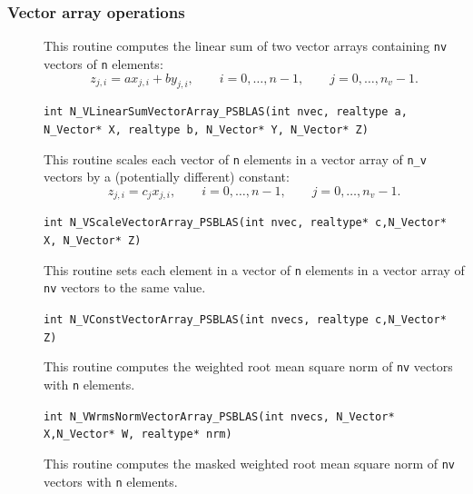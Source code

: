 \documentclass[twoside,a4paper]{refart}
\theoremstyle{definition}
\begin{document}
	\subsubsection{Vector array operations}
 \begin{description}
 	\item[] This routine computes the linear sum of two vector arrays
 	containing \lstinline[style=CStyle]|nv| vectors of \lstinline[style=CStyle]|n| elements:
 	\begin{equation*}
 		z_{j,i} = a x_{j,i} + b y_{j,i}, \qquad i=0,\ldots,n-1, \qquad j=0,\ldots,n_v -1.
 	\end{equation*}
 	
 	 \lstinline[style=CStyle]|int N_VLinearSumVectorArray_PSBLAS(int nvec, realtype a, N_Vector* X, realtype b, N_Vector* Y, N_Vector* Z)|
 	
 	\item[] This routine scales each vector of \lstinline[style=CStyle]|n| elements in a vector
 	array of \lstinline[style=CStyle]|n_v| vectors by a (potentially different) constant:
 	\begin{equation*}
 		z_{j,i} = c_j x_{j,i}, \qquad i=0,\ldots,n-1, \qquad j=0,\ldots,n_v-1.
 	\end{equation*}
 	
 	 \lstinline[style=CStyle]|int N_VScaleVectorArray_PSBLAS(int nvec, realtype* c,N_Vector* X, N_Vector* Z)|
 	
 	\item[] This routine sets each element in a vector of \lstinline[style=CStyle]|n|  elements in a vector array of \lstinline[style=CStyle]|nv|  vectors to the same value.
 	
 	 \lstinline[style=CStyle]|int N_VConstVectorArray_PSBLAS(int nvecs, realtype c,N_Vector* Z)|
 	
 	\item[] This routine computes the weighted root mean square
 	norm of \lstinline[style=CStyle]|nv| vectors with \lstinline[style=CStyle]|n| elements.
 	
 	 \lstinline[style=CStyle]|int N_VWrmsNormVectorArray_PSBLAS(int nvecs, N_Vector* X,N_Vector* W, realtype* nrm)|
 	
 	\item[] This routine computes the masked weighted root mean square norm of \lstinline[style=CStyle]|nv| vectors with \lstinline[style=CStyle]|n| elements.
 	

\end{description}
\end{document}
